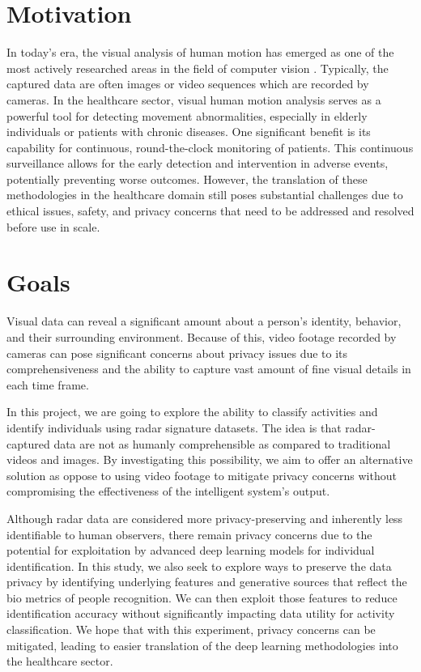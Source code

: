 \documentclass{l4proj}
\begin{document}
\section{Motivation}
In today's era, the visual analysis of human motion has emerged as one of the most actively researched areas in the field of computer vision \citep{human_motion_technological_advancements, evolution_of_vision-based_motion_analysis}. Typically, the captured data are often images or video sequences which are recorded by cameras. In the healthcare sector, visual human motion analysis serves as a powerful tool for detecting movement abnormalities, especially in elderly individuals or patients with chronic diseases. One significant benefit is its capability for continuous, round-the-clock monitoring of patients. This continuous surveillance allows for the early detection and intervention in adverse events, potentially preventing worse outcomes. However, the translation of these methodologies in the healthcare domain still poses substantial challenges due to ethical issues, safety, and privacy concerns that need to be addressed and resolved before use in scale.


\section{Goals}
Visual data can reveal a significant amount about a person's identity, behavior, and their surrounding environment. Because of this, video footage recorded by cameras can pose significant concerns about privacy issues due to its comprehensiveness and the ability to capture vast amount of fine visual details in each time frame.

In this project, we are going to explore the ability to classify activities and identify individuals using radar signature datasets. The idea is that radar-captured data are not as humanly comprehensible as compared to traditional videos and images. By investigating this possibility, we aim to offer an alternative solution as oppose to using video footage to mitigate privacy concerns without compromising the effectiveness of the intelligent system's output.

Although radar data are considered more privacy-preserving and inherently less identifiable to human observers, there remain privacy concerns due to the potential for exploitation by advanced deep learning models for individual identification. In this study, we also seek to explore ways to preserve the data privacy by identifying underlying features and generative sources that reflect the bio metrics of people recognition. We can then exploit those features to reduce identification accuracy without significantly impacting data utility for activity classification. We hope that with this experiment, privacy concerns can be mitigated, leading to easier translation of the deep learning methodologies into the healthcare sector.
\end{document}
